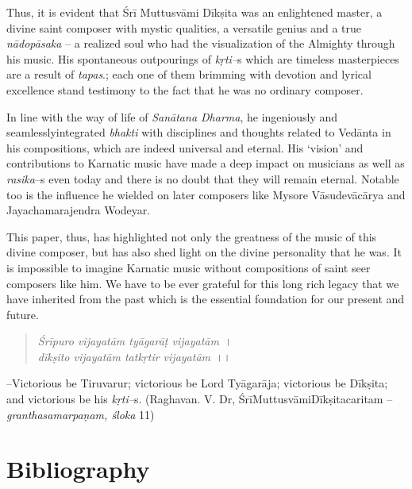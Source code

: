Thus, it is evident that Śrī Muttusvāmi Dīkṣita was an enlightened master, a divine saint composer with mystic qualities, a versatile genius and a true \textit{nādopāsaka} – a realized soul who had the visualization of the Almighty through his music. His spontaneous outpourings of \textit{kṛti–}s which are timeless masterpieces are a result of \textit{tapas}.; each one of them brimming with devotion and lyrical excellence stand testimony to the fact that he was no ordinary composer.

In line with the way of life of \textit{Sanātana Dharma}, he ingeniously and seamlesslyintegrated \textit{bhakti} with disciplines and thoughts related to Vedānta in his compositions, which are indeed universal and eternal. His ‘vision’ and contributions to Karnatic music have made a deep impact on musicians as well as \textit{rasika}–s even today and there is no doubt that they will remain eternal. Notable too is the influence he wielded on later composers like Mysore Vāsudevācārya and Jayachamarajendra Wodeyar.

This paper, thus, has highlighted not only the greatness of the music of this divine composer, but has also shed light on the divine personality that he was. It is impossible to imagine Karnatic music without compositions of saint seer composers like him. We have to be ever grateful for this long rich legacy that we have inherited from the past which is the essential foundation for our present and future.

\begin{verse}
\textit{Śrīpuro vijayatām tyāgarāṭ vijayatām}~।\\\textit{dīkṣito vijayatām tatkṛtir vijayatām}~।।
\end{verse}

–Victorious be Tiruvarur; victorious be Lord Tyāgarāja; victorious be Dīkṣita; and victorious be his \textit{kṛti–}s. (Raghavan. V. Dr, ŚrīMuttusvāmiDīkṣitacaritam – \textit{granthasamarpaṇam, śloka} 11)


\section*{Bibliography}

